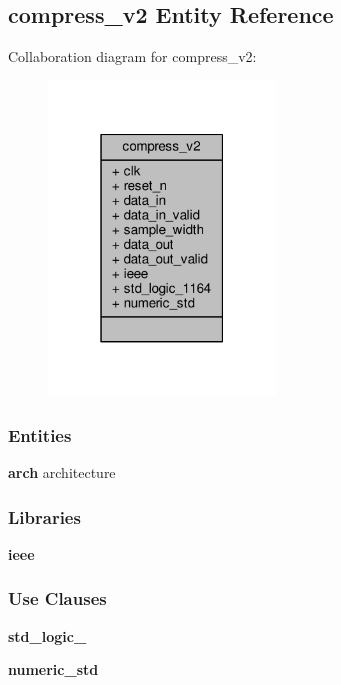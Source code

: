 \subsection{compress\+\_\+v2 Entity Reference}
\label{classcompress__v2}


Collaboration diagram for compress\+\_\+v2\+:\nopagebreak
\begin{figure}[H]
\begin{center}
\leavevmode
\includegraphics[width=171pt]{d4/dc8/classcompress__v2__coll__graph}
\end{center}
\end{figure}
\subsubsection*{Entities}
\begin{DoxyCompactItemize}
\item 
{\bf arch} architecture
\end{DoxyCompactItemize}
\subsubsection*{Libraries}
 \begin{DoxyCompactItemize}
\item 
{\bf ieee} 
\end{DoxyCompactItemize}
\subsubsection*{Use Clauses}
 \begin{DoxyCompactItemize}
\item 
{\bf std\+\_\+logic\+\_}   
\item 
{\bf numeric\+\_\+std}   
\end{DoxyCompactItemize}
